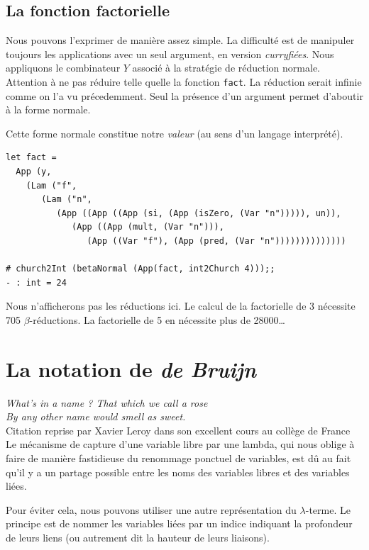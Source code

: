 \documentclass[11pt]{book}
\begin{document}
\subsection{La fonction factorielle}
Nous pouvons l'exprimer de manière assez simple. La difficulté est de manipuler toujours les applications avec un seul argument, en version
\textit{curryfiées}.
Nous appliquons le combinateur $Y$ associé à la stratégie de réduction normale.
Attention à ne pas réduire telle quelle la fonction \verb+fact+. La réduction serait infinie comme on l'a vu précedemment. Seul la présence
d'un argument permet d'aboutir à la forme normale.

Cette forme normale constitue notre \textit{valeur} (au sens d'un langage interprété).
\begin{Verbatim}
let fact =
  App (y,
    (Lam ("f",
       (Lam ("n",
          (App ((App ((App (si, (App (isZero, (Var "n"))))), un)),
             (App ((App (mult, (Var "n"))),
                (App ((Var "f"), (App (pred, (Var "n"))))))))))))))

# church2Int (betaNormal (App(fact, int2Church 4)));;
- : int = 24																																							 
\end{Verbatim}
Nous n'afficherons pas les réductions ici. Le calcul de la factorielle de 3 nécessite 705 $\beta$-réductions. 
La factorielle de 5 en nécessite plus de 28000\ldots


\section{La notation de \textit{de Bruijn}}
\noindent
\textit{What's in a name ? That which we call a rose \\
	   By any other name would smell as sweet.}\cite{WS} \\
	   Citation reprise par Xavier Leroy dans
	   son excellent cours au collège de France \\


\vspace{0.4cm}
Le mécanisme de capture d'une variable libre par une lambda, qui nous oblige à faire de manière fastidieuse
du renommage ponctuel de variables, est dû au fait qu'il y a un partage possible entre les noms des variables
libres et des variables liées. 

Pour éviter cela, nous pouvons utiliser une autre représentation du $\lambda$-terme. Le principe est
de nommer les variables liées par un indice indiquant la profondeur de leurs liens (ou autrement dit la
hauteur de leurs liaisons).
\end{document}
